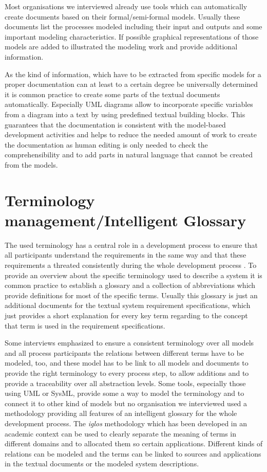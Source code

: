 \documentclass{./template/openetcs2}
\begin{document}
Most organisations we interviewed already use tools which can automatically create documents based on their formal/semi-formal models. Usually these documents list the processes modeled including their input and outputs and some important modeling characteristics. If possible graphical representations of those models are added to illustrated the modeling work and provide additional information.

As the kind of information, which have to be extracted from specific models for a proper documentation can at least to a certain degree be universally determined it is common practice to 
create some parts of the textual documents automatically. Especially UML diagrams allow to incorporate specific variables from a diagram into a text by using predefined textual building blocks. This guarantees that the documentation is consistent with the model-based development activities and helps to reduce the needed amount of work to create the documentation as human editing is only needed to check the comprehensibility and to add parts in natural language that cannot be created from the models.

\section{Terminology management/Intelligent Glossary}

The used terminology has a central role in a development process to ensure that all participants understand the requirements in the same way and that these requirements a threated consistently during the whole development process \citep{Schnieder.2010}. To provide an overview about the specific terminology used to describe a system it is common practice to establish a glossary and a collection of abbreviations which provide definitions for most of the specific terms. Usually this glossary is just an additional documents for the textual system requirement specifications, which just provides a short explanation for every key term regarding to the concept that term is used in the requirement specifications. 

Some interviews emphasized to ensure a consistent terminology over all models and all process participants the relations between different terms have to be modeled, too, and these model has to be link to all models and documents to provide the right terminology to every process step, to allow additions and to provide a traceability over all abstraction levels. Some tools, especially those using UML or SysML, provide some a way to model the terminology and to connect it to other kind of models but no organisation we interviewed used a methodology providing all features of an intelligent glossary for the whole development process. The \textit{iglos} methodology which has been developed in an academic context can be used to clearly separate the meaning of terms in different domains and to allocated them so certain applications. Different kinds of relations can be modeled and the terms can be linked to sources and applications in the textual documents or the modeled system descriptions.
\end{document}

